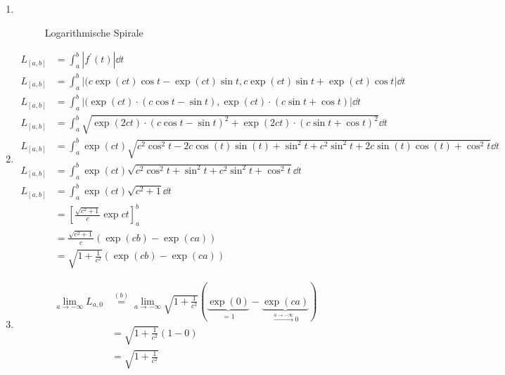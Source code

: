 \documentclass[sectionformat=aufgabe]{gadsescript}
\begin{document}
\begin{enumerate}[label=(\alph*)]
	\item ~
		\begin{figure}[h]
			\centering
			\caption{Logarithmische Spirale}
			\label{fig:Logarithmische Spirale}
		\end{figure}
	\item 
		\begin{align*}
			L_{[a, b]} &= \int_{a}^{b} \left| f^\prime (t) \right| \dd t \\
			L_{[a, b]} &= \int_{a}^{b} \left| (c \exp (ct) \cos t - \exp (ct) \sin t, c \exp (ct) \sin t + \exp (ct) \cos t \right| \dd t \\
			L_{[a, b]} &= \int_{a}^{b} \left| (\exp (ct) \cdot ( c \cos t - \sin t), \exp (ct) \cdot (c \sin t + \cos t) \right| \dd t \\
			L_{[a, b]} &= \int_{a}^{b} \sqrt{\exp (2ct) \cdot ( c \cos t - \sin t)^2 + \exp (2ct) \cdot (c \sin t + \cos t)^2} \dd t \\
			L_{[a, b]} &= \int_{a}^{b} \exp (ct) \sqrt{c^2 \cos^2 t -2 c \cos (t) \sin (t) + \sin^2 t + c^2 \sin^2 t +2 c\sin (t) \cos (t) + \cos^2 t} \dd t \\
			L_{[a, b]} &= \int_{a}^{b} \exp (ct) \sqrt{c^2 \cos^2 t + \sin^2 t + c^2 \sin^2 t + \cos^2 t} \dd t \\
			L_{[a, b]} &= \int_{a}^{b} \exp (ct) \sqrt{c^2 + 1} \dd t \\
			&= \left[ \frac{ \sqrt{c^2 + 1}  }{ c } \exp ct \right]_{a} ^{b}  \\
			&= \frac{ \sqrt{c^2 + 1 }  }{ c } (\exp (cb) - \exp (ca)) \\
			&= \sqrt{ 1 + \frac{ 1 }{ c^2 }  } (\exp (cb) - \exp (ca))
		\end{align*}

	\item 
		\begin{align*}
		\lim_{a \to -\infty} L_{a, 0} &\overset{(b)}{=} \lim_{a \to -\infty}  \sqrt{1 + \frac{ 1 }{ c^2 } } (\underbrace{\exp (0)}_{= 1} - \underbrace{\exp (ca)}_{ \overset{a \to -\infty}{\to } 0} ) \\
			&= \sqrt{1 + \frac{ 1 }{ c^2 } } (1 - 0) \\
			&= \sqrt{1 + \frac{ 1 }{ c^2 } }
		\end{align*}
		

\end{enumerate}
\end{document}
